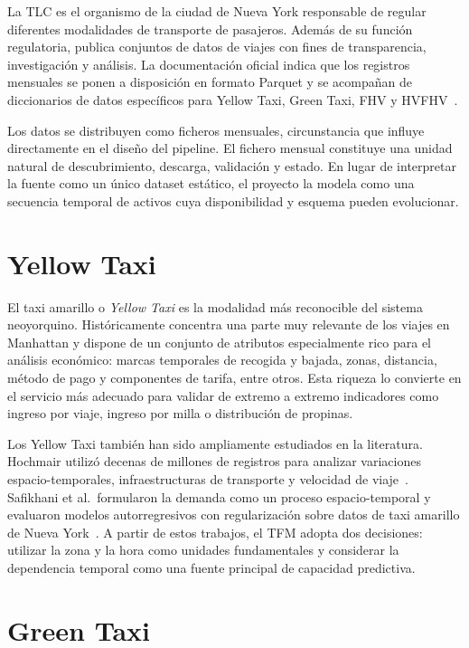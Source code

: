 La TLC es el organismo de la ciudad de Nueva York responsable de regular diferentes modalidades de transporte de pasajeros. Además de su función regulatoria, publica conjuntos de datos de viajes con fines de transparencia, investigación y análisis. La documentación oficial indica que los registros mensuales se ponen a disposición en formato Parquet y se acompañan de diccionarios de datos específicos para Yellow Taxi, Green Taxi, FHV y HVFHV~\cite{nyctlc_tripdata,nyctlc_userguide}.

Los datos se distribuyen como ficheros mensuales, circunstancia que influye directamente en el diseño del pipeline. El fichero mensual constituye una unidad natural de descubrimiento, descarga, validación y estado. En lugar de interpretar la fuente como un único dataset estático, el proyecto la modela como una secuencia temporal de activos cuya disponibilidad y esquema pueden evolucionar.

\section{Yellow Taxi}

El taxi amarillo o \textit{Yellow Taxi} es la modalidad más reconocible del sistema neoyorquino. Históricamente concentra una parte muy relevante de los viajes en Manhattan y dispone de un conjunto de atributos especialmente rico para el análisis económico: marcas temporales de recogida y bajada, zonas, distancia, método de pago y componentes de tarifa, entre otros. Esta riqueza lo convierte en el servicio más adecuado para validar de extremo a extremo indicadores como ingreso por viaje, ingreso por milla o distribución de propinas.

Los Yellow Taxi también han sido ampliamente estudiados en la literatura. Hochmair utilizó decenas de millones de registros para analizar variaciones espacio-temporales, infraestructuras de transporte y velocidad de viaje~\cite{hochmair2016}. Safikhani et al.\ formularon la demanda como un proceso espacio-temporal y evaluaron modelos autorregresivos con regularización sobre datos de taxi amarillo de Nueva York~\cite{safikhani2020}. A partir de estos trabajos, el TFM adopta dos decisiones: utilizar la zona y la hora como unidades fundamentales y considerar la dependencia temporal como una fuente principal de capacidad predictiva.

\section{Green Taxi}

